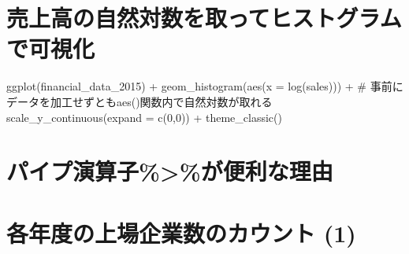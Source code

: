 \documentclass[
  letterpaper,
  DIV=11,
  numbers=noendperiod]{scrreprt}
\newenvironment{Shaded}{\begin{snugshade}}{\end{snugshade}}
\newcommand{\AttributeTok}[1]{\textcolor[rgb]{0.40,0.45,0.13}{#1}}
\newcommand{\CommentTok}[1]{\textcolor[rgb]{0.37,0.37,0.37}{#1}}
\newcommand{\DecValTok}[1]{\textcolor[rgb]{0.68,0.00,0.00}{#1}}
\newcommand{\FunctionTok}[1]{\textcolor[rgb]{0.28,0.35,0.67}{#1}}
\newcommand{\NormalTok}[1]{\textcolor[rgb]{0.00,0.23,0.31}{#1}}
\newcommand{\SpecialCharTok}[1]{\textcolor[rgb]{0.37,0.37,0.37}{#1}}
\begin{document}
\section{売上高の自然対数を取ってヒストグラムで可視化}\label{ux58f2ux4e0aux9ad8ux306eux81eaux7136ux5bfeux6570ux3092ux53d6ux3063ux3066ux30d2ux30b9ux30c8ux30b0ux30e9ux30e0ux3067ux53efux8996ux5316}

\begin{Shaded}
\begin{Highlighting}[]
\FunctionTok{ggplot}\NormalTok{(financial\_data\_2015) }\SpecialCharTok{+} 
  \FunctionTok{geom\_histogram}\NormalTok{(}\FunctionTok{aes}\NormalTok{(}\AttributeTok{x =} \FunctionTok{log}\NormalTok{(sales))) }\SpecialCharTok{+} \CommentTok{\# 事前にデータを加工せずともaes()関数内で自然対数が取れる}
  \FunctionTok{scale\_y\_continuous}\NormalTok{(}\AttributeTok{expand =} \FunctionTok{c}\NormalTok{(}\DecValTok{0}\NormalTok{,}\DecValTok{0}\NormalTok{)) }\SpecialCharTok{+} 
  \FunctionTok{theme\_classic}\NormalTok{()}
\end{Highlighting}
\end{Shaded}

\section{パイプ演算子\%\textgreater\%が便利な理由}\label{ux30d1ux30a4ux30d7ux6f14ux7b97ux5b50ux304cux4fbfux5229ux306aux7406ux7531}

\begin{Shaded}
\end{Shaded}

\section{各年度の上場企業数のカウント
(1)}\label{ux5404ux5e74ux5ea6ux306eux4e0aux5834ux4f01ux696dux6570ux306eux30abux30a6ux30f3ux30c8-1}
\end{document}
